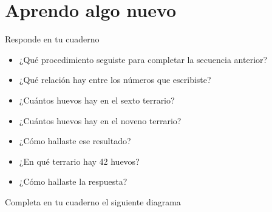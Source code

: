 \documentclass[10pt,twoside]{article}
\begin{document}
\section*{Aprendo algo nuevo}
Responde en tu cuaderno
\begin{itemize}
\item ¿Qué procedimiento seguiste para completar la
secuencia anterior?
\item ¿Qué relación hay entre los números que escribiste?
\item ¿Cuántos huevos hay en el sexto terrario?
\item ¿Cuántos huevos hay en el noveno terrario?
\item ¿Cómo hallaste ese resultado?
\item ¿En qué terrario hay 42 huevos?
\item ¿Cómo hallaste la respuesta?
\end{itemize}
Completa en tu cuaderno el siguiente diagrama
\end{document}
